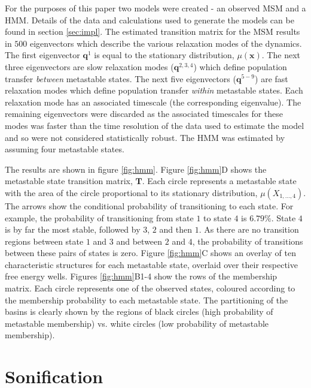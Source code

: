 \documentclass[a4paper,10pt,oneside]{article}
\begin{document}
\begin{sloppy}
For the purposes of this paper two models were created - an observed MSM and a HMM. Details of the data and calculations used to generate the models can be found in section \ref{sec:impl}. The estimated transition matrix for the MSM results in $500$ eigenvectors which describe the various relaxation modes of the dynamics.  The first eigenvector $\mathbf{q}^{1}$ is equal to the stationary distribution, $\mu(\mathbf{x})$.  The next three eigenvectors are slow relaxation modes ($\mathbf{q}^{2,3,4}$) which define population transfer \textit{between} metastable states.  The next five eigenvectors ($\mathbf{q}^{5-9}$) are fast relaxation modes which define population transfer \textit{within} metastable states. Each relaxation mode has an associated timescale (the corresponding eigenvalue). The remaining eigenvectors were discarded as the associated timescales  for these modes was faster than the time resolution of the data used to estimate the model and so were not considered statistically robust. The HMM was estimated by assuming four metastable states. 

The results are shown in figure \ref{fig:hmm}.  Figure \ref{fig:hmm}D shows the metastable state transition matrix, $\mathbf{T}$. Each circle represents a metastable state with the area of the circle proportional to its stationary distribution, $\mu(X_{1,...,4})$.  The arrows show the conditional probability of transitioning to each state. For example, the probability of transitioning from state $1$ to state $4$ is $6.79\%$.  State $4$ is by far the most stable, followed by $3$, $2$ and then $1$. As there are no transition regions between state $1$ and $3$ and between $2$ and $4$, the probability of transitions between these pairs of states is zero. Figure \ref{fig:hmm}C shows an overlay of ten characteristic structures for each metastable state, overlaid over their respective free energy wells. Figures \ref{fig:hmm}B1-4 show the rows of the membership matrix. Each circle represents one of the observed states, coloured according to the membership probability to each metastable state.  The  partitioning of the basins is clearly shown by the regions of black circles (high probability of metastable membership) vs. white circles (low probability of metastable membership). 

\section{Sonification} \label{sec:sonification}


\end{sloppy}
\end{document}
